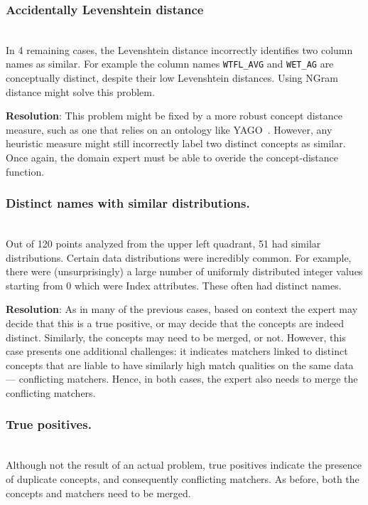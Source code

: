 \smallskip
\subsubsection{Accidentally Levenshtein distance}~\\
In 4 remaining cases, the Levenshtein distance incorrectly identifies two column names as similar.  For example the column names \texttt{WTFL\_AVG} and \texttt{WET\_AG} are conceptually distinct, despite their low Levenshtein distances. Using NGram distance might solve this problem. 

\textbf{Resolution}: 
This problem might be fixed by a more robust concept distance measure, such as one that relies on an ontology like YAGO~\cite{fabian2007yago}.  
However, any heuristic measure might still incorrectly label two distinct concepts as similar.  
Once again, the domain expert must be able to overide the concept-distance function.


\smallskip
\subsubsection{Distinct names with similar distributions.}~\\
Out of 120 points analyzed from the upper left quadrant, 51 had similar distributions.
Certain data distributions were incredibly common.
For example, there were (unsurprisingly) a large number of uniformly distributed integer values starting from 0 which were Index attributes. These often had distinct names.

\textbf{Resolution}:
As in many of the previous cases, based on context the expert may decide that this is a true positive, or may  decide that the concepts are indeed distinct.
Similarly, the concepts may need to be merged, or not.
However, this case presents one additional challenges: it indicates  matchers linked to distinct concepts that are liable to have similarly high match qualities on the same data --- conflicting matchers.
Hence, in both cases, the expert also needs to merge the conflicting matchers.

\smallskip
\subsubsection{True positives.}~\\
Although not the result of an actual problem, true positives indicate the presence of duplicate concepts, and consequently conflicting matchers.  As before, both the concepts and matchers need to be merged.



